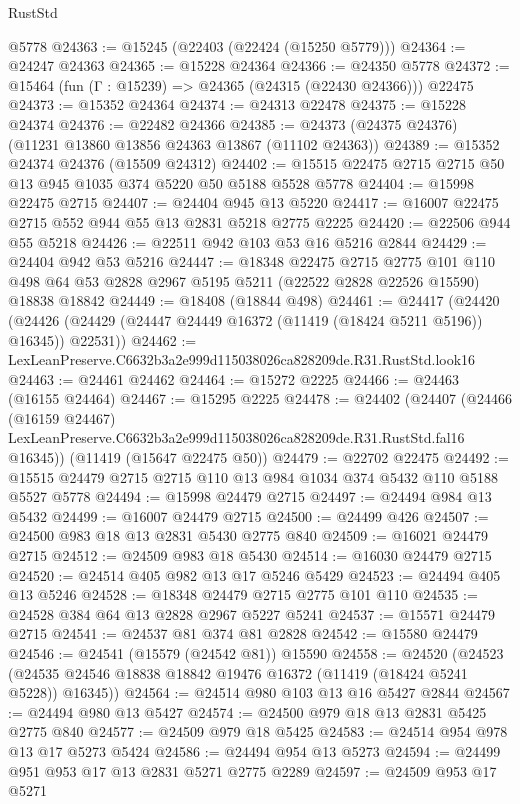 \begin{lexlean}{RustStd}
\begin{coremodule}
    @5778
@24363 := @15245 (@22403 (@22424 (@15250 @5779)))
@24364 := @24247 @24363
@24365 := @15228 @24364
@24366 := @24350 @5778
@24372 := @15464 (fun (Γ : @15239) => @24365 (@24315 (@22430 @24366))) @22475
@24373 := @15352 @24364
@24374 := @24313 @22478
@24375 := @15228 @24374
@24376 := @22482 @24366
@24385 := @24373 (@24375 @24376) (@11231 @13860 @13856 @24363 @13867 (@11102 @24363))
@24389 := @15352 @24374 @24376 (@15509 @24312)
@24402 := @15515 @22475 @2715 @2715 @50 @13 @945 @1035 @374 @5220 @50 @5188 @5528 @5778
@24404 := @15998 @22475 @2715
@24407 := @24404 @945 @13 @5220
@24417 := @16007 @22475 @2715 @552 @944 @55 @13 @2831 @5218 @2775 @2225
@24420 := @22506 @944 @55 @5218
@24426 := @22511 @942 @103 @53 @16 @5216 @2844
@24429 := @24404 @942 @53 @5216
@24447 := @18348
    @22475
    @2715
    @2775
    @101
    @110
    @498
    @64
    @53
    @2828
    @2967
    @5195
    @5211
    (@22522 @2828 @22526 @15590)
    @18838
    @18842
@24449 := @18408 (@18844 @498)
@24461 := @24417
    (@24420 (@24426 (@24429 (@24447 @24449 @16372 (@11419 (@18424 @5211 @5196)) @16345)) @22531))
@24462 := LexLeanPreserve.C6632b3a2e999d115038026ca828209de.R31.RustStd.look16
@24463 := @24461 @24462
@24464 := @15272 @2225
@24466 := @24463 (@16155 @24464)
@24467 := @15295 @2225
@24478 := @24402
    (@24407
      (@24466
        (@16159 @24467)
        LexLeanPreserve.C6632b3a2e999d115038026ca828209de.R31.RustStd.fal16
        @16345))
    (@11419 (@15647 @22475 @50))
@24479 := @22702 @22475
@24492 := @15515 @24479 @2715 @2715 @110 @13 @984 @1034 @374 @5432 @110 @5188 @5527 @5778
@24494 := @15998 @24479 @2715
@24497 := @24494 @984 @13 @5432
@24499 := @16007 @24479 @2715
@24500 := @24499 @426
@24507 := @24500 @983 @18 @13 @2831 @5430 @2775 @840
@24509 := @16021 @24479 @2715
@24512 := @24509 @983 @18 @5430
@24514 := @16030 @24479 @2715
@24520 := @24514 @405 @982 @13 @17 @5246 @5429
@24523 := @24494 @405 @13 @5246
@24528 := @18348 @24479 @2715 @2775 @101 @110
@24535 := @24528 @384 @64 @13 @2828 @2967 @5227 @5241
@24537 := @15571 @24479 @2715
@24541 := @24537 @81 @374 @81 @2828
@24542 := @15580 @24479
@24546 := @24541 (@15579 (@24542 @81)) @15590
@24558 := @24520
    (@24523 (@24535 @24546 @18838 @18842 @19476 @16372 (@11419 (@18424 @5241 @5228)) @16345))
@24564 := @24514 @980 @103 @13 @16 @5427 @2844
@24567 := @24494 @980 @13 @5427
@24574 := @24500 @979 @18 @13 @2831 @5425 @2775 @840
@24577 := @24509 @979 @18 @5425
@24583 := @24514 @954 @978 @13 @17 @5273 @5424
@24586 := @24494 @954 @13 @5273
@24594 := @24499 @951 @953 @17 @13 @2831 @5271 @2775 @2289
@24597 := @24509 @953 @17 @5271

\end{coremodule}
\end{lexlean}
